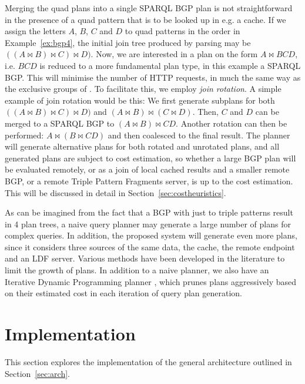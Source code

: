 Merging the quad plans into a single SPARQL BGP plan is not
straightforward in the presence of a quad pattern that is to be looked
up in e.g. a cache. If we assign the letters $A$, $B$, $C$ and $D$ to
quad patterns  in the order in
Example~\ref{ex:bgp4}, the initial join tree produced by parsing may
be $ ((A \bowtie B )\bowtie C) \bowtie D) $. Now, we are interested in
a plan on the form $A \bowtie BCD$, i.e. $BCD$ is reduced to a more
fundamental plan type, in this example a SPARQL BGP. This will
minimise the number of HTTP requests, in much the same way as the
exclusive groups of
\cite{springerlink:10.1007/978-3-642-25073-6-38}. To facilitate this,
we employ \emph{join rotation}. A simple example of join rotation
would be this: We first generate subplans for both $((A \bowtie B
)\bowtie C) \bowtie D) $ and $ (A \bowtie B )\bowtie (C \bowtie D)
$. Then, $C$ and $D$ can be merged to a SPARQL BGP to $ (A \bowtie B
)\bowtie CD $. Another rotation can then be performed: $ A \bowtie (B
\bowtie CD) $ and then coalesced to the final result. The planner will
generate alternative plans for both rotated and unrotated plans, and
all generated plans are subject to cost estimation, so whether a large
BGP plan will be evaluated remotely, or as a join of local cached
results and a smaller remote BGP, or a remote Triple Pattern Fragments
server, is up to the cost estimation. This will be discussed in detail
in Section~\ref{sec:costheuristics}.

As can be imagined from the fact that a BGP with just to triple
patterns result in 4 plan trees, a naive query planner may generate a
large number of plans for complex queries. In addition, the proposed
system will generate even more plans, since it considers three sources
of the same data, the cache, the remote endpoint and an LDF
server. Various methods have been developed in the literature to limit
the growth of plans. In addition to a naive planner, we also have an
Iterative Dynamic Programming planner
\cite{Kossmann:2000:IDP:352958.352982}, which prunes plans
aggressively based on their estimated cost in each iteration of query
plan generation.

\section{Implementation}\label{sec:impl}

This section explores the implementation of the general architecture
outlined in Section~\ref{sec:arch}. 

